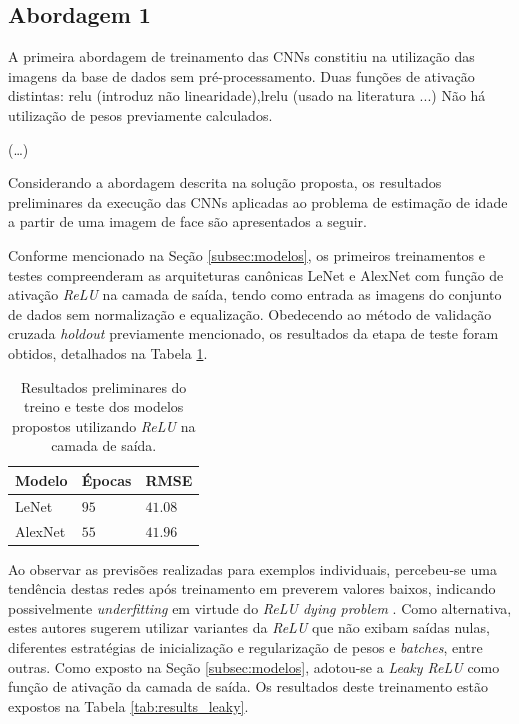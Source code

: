 
\subsection{Abordagem 1}

A primeira abordagem de treinamento das CNNs constitiu na utilização das imagens da base de dados sem pré-processamento. Duas funções de ativação distintas: relu (introduz não linearidade),lrelu (usado na literatura ...)
Não há utilização de pesos previamente calculados.

(\ldots)





Considerando a abordagem descrita na solução proposta, os resultados preliminares da execução das CNNs aplicadas ao problema de estimação de idade a partir de uma imagem de face são apresentados a seguir.

Conforme mencionado na Seção \ref{subsec:modelos}, os primeiros treinamentos e testes compreenderam as arquiteturas canônicas LeNet e AlexNet com função de ativação \emph{ReLU} na camada de saída, tendo como entrada as imagens do conjunto de dados sem normalização e equalização. Obedecendo ao método de validação cruzada \emph{holdout} previamente mencionado, os resultados da etapa de teste foram obtidos, detalhados na Tabela \ref{tab:results_relu}.

\begin{table}[!ht]
     \caption{Resultados preliminares do treino e teste dos modelos propostos utilizando \emph{ReLU} na camada de saída.}
     \label{tab:results_relu}
     \centering
     \begin{tabular}{l l l}
          \toprule
          Modelo & Épocas &RMSE \\
          \midrule
          LeNet & $95$ & $41.08$ \\
          AlexNet & $55$ & $41.96$\\
          \bottomrule
     \end{tabular}
\end{table}

Ao observar as previsões realizadas para exemplos individuais, percebeu-se uma tendência destas redes após treinamento em preverem valores baixos, indicando possivelmente \emph{underfitting} em virtude do \emph{ReLU dying problem} \cite{djork2015elus, dabal2018elus}. Como alternativa, estes autores sugerem  utilizar variantes da \emph{ReLU} que não exibam saídas nulas, diferentes estratégias de inicialização e regularização de pesos e \emph{batches}, entre outras. Como exposto na Seção \ref{subsec:modelos}, adotou-se a \emph{Leaky ReLU} como função de ativação da camada de saída. Os resultados deste treinamento estão expostos na Tabela \ref{tab:results_leaky}.

